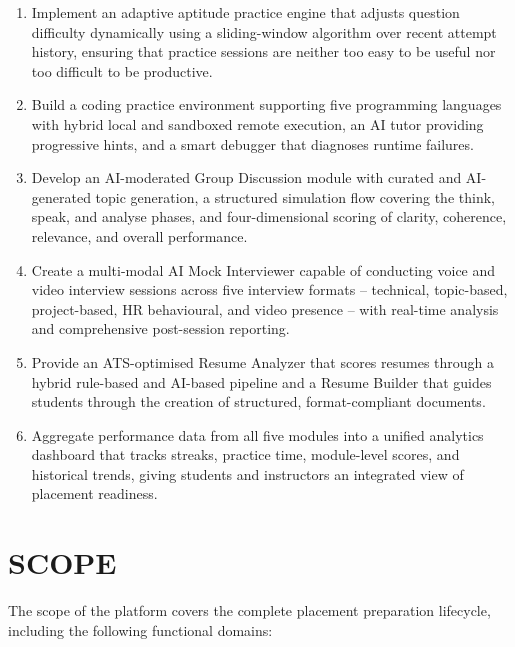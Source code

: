 \documentclass[12pt,a4paper]{report}
\begin{document}
\begin{enumerate}[leftmargin=0.5in, label=(\arabic*), topsep=4pt, itemsep=3pt]
    \item Implement an adaptive aptitude practice engine that adjusts question difficulty dynamically using a sliding-window algorithm over recent attempt history, ensuring that practice sessions are neither too easy to be useful nor too difficult to be productive.
    \item Build a coding practice environment supporting five programming languages with hybrid local and sandboxed remote execution, an AI tutor providing progressive hints, and a smart debugger that diagnoses runtime failures.
    \item Develop an AI-moderated Group Discussion module with curated and AI-generated topic generation, a structured simulation flow covering the think, speak, and analyse phases, and four-dimensional scoring of clarity, coherence, relevance, and overall performance.
    \item Create a multi-modal AI Mock Interviewer capable of conducting voice and video interview sessions across five interview formats -- technical, topic-based, project-based, HR behavioural, and video presence -- with real-time analysis and comprehensive post-session reporting.
    \item Provide an ATS-optimised Resume Analyzer that scores resumes through a hybrid rule-based and AI-based pipeline and a Resume Builder that guides students through the creation of structured, format-compliant documents.
    \item Aggregate performance data from all five modules into a unified analytics dashboard that tracks streaks, practice time, module-level scores, and historical trends, giving students and instructors an integrated view of placement readiness.
\end{enumerate}

\section{SCOPE}

The scope of the platform covers the complete placement preparation lifecycle, including the following functional domains:
\end{document}
